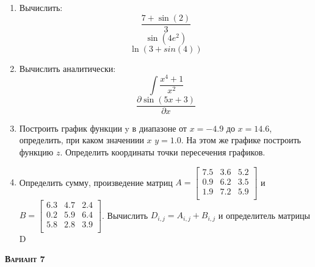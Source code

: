 \begin{enumerate}
\item Вычислить: 
\begin{equation*}\dfrac{7+\sin(2)}{3}              \end{equation*}
\begin{equation*}\sin(4 e^2)                       \end{equation*}
\begin{equation*}\ln(3+sin(4))                     \end{equation*}

\item Вычислить аналитически: 
 \begin{equation*} \int \dfrac{x^4+1}{x^2} \end{equation*}\begin{equation*} {\dfrac{\partial \sin(5 x +3)}{\partial x}} \end{equation*}
\item Построить график функции y в диапазоне от $x=-4.9$ до $x=14.6$, определить, при каком значениии $x$ $y=1.0$. На этом же графике построить функцию $z $. Определить координаты точки пересечения графиков. \item Определить сумму, произведение матриц $A=\begin{bmatrix}
7.5 &3.6 &5.2 \\
0.9 &6.2 &3.5 \\
1.9 &7.2 &5.9 \\
\end{bmatrix}
$ и $B=\begin{bmatrix}
6.3 &4.7 &2.4 \\
0.2 &5.9 &6.4 \\
5.8 &2.8 &3.9 \\
\end{bmatrix}
$. Вычислить $D_{i,j}=A_{i,j} + B_{i,j}$ и определитель матрицы D
\end{enumerate}
\textsc{\textbf{Вариант 7}}

